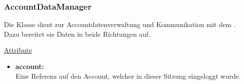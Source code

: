 \subsubsection{AccountDataManager}\label{AccountDataManager}
Die Klasse dient zur Accountdatenverwaltung und Kommunikation mit dem . Dazu bereitet sie Daten in beide Richtungen auf. \newline

\underline{Attribute}
\begin{itemize}
\itemsep0pt

\item \textbf{account: } \hfill\\ 
Eine Referenz auf den Account, welcher in dieser Sitzung eingeloggt wurde.

\end{itemize}

